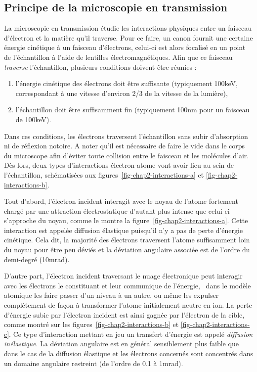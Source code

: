     \subsection{Principe de la microscopie en transmission}\label{subsec-principe-physique-tem}

    La microscopie en transmission étudie les interactions physiques entre un faisceau d'électron et la matière qu'il traverse. Pour ce faire, un canon fournit une certaine énergie cinétique à un faisceau d'électrons, celui-ci est alors focalisé en un point de l'échantillon à l'aide de lentilles électromagnétiques. Afin que ce faisceau \emph{traverse} l'échantillon, plusieurs conditions doivent être réunies :
    \begin{enumerate}[label=(\alph*)]
    	\item l'énergie cinétique des électrons doit être suffisante (typiquement 100keV, correspondant à une vitesse d'environ 2/3 de la vitesse de la lumière),
    	\item l'échantillon doit être suffisamment fin (typiquement 100nm pour un faisceau de 100keV).
    \end{enumerate}
    Dans ces conditions, les électrons traversent l'échantillon sans subir d'absorption ni de réflexion notoire. A noter qu'il est nécessaire de faire le vide dans le corps du microscope afin d'éviter toute collision entre le faisceau et les molécules d'air. Dès lors, deux types d'interactions électron-atome vont avoir lieu au sein de l'échantillon, schématisées aux figures~\ref{fig-chap2-interactions-a} et \ref{fig-chap2-interactions-b}.

    Tout d'abord, l'électron incident interagit avec le noyau de l'atome fortement chargé par une attraction électrostatique d'autant plus intense que celui-ci s'approche du noyau, comme le montre la figure~\ref{fig-chap2-interactions-a}. Cette interaction est appelée diffusion élastique puisqu'il n'y a pas de perte d'énergie cinétique. Cela dit, la majorité des électrons traversent l'atome suffisamment loin du noyau pour être peu déviés et la déviation angulaire associée est de l'ordre du demi-degré (10\;mrad).
    
    D'autre part, l'électron incident traversant le nuage électronique peut interagir avec les électrons le constituant et leur communique de l'énergie, \ie\ dans le modèle atomique les faire passer d'un niveau à un autre, ou même les expulser complètement de façon à transformer l'atome initialement neutre en ion. La perte  d'énergie subie par l'électron incident est ainsi gagnée par l'électron de la cible, comme montré sur les figures~\ref{fig-chap2-interactions-b} et \ref{fig-chap2-interactions-c}. Ce type d'interaction mettant en jeu un transfert d'énergie est appelé \emph{diffusion inélastique}. La déviation angulaire est en général sensiblement plus faible que dans le cas de la diffusion élastique et les électrons concernés sont concentrés dans un domaine angulaire restreint (de l'ordre de 0.1 à 1\;mrad).
    
